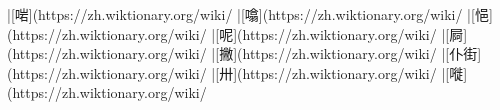 |[啱](https://zh.wiktionary.org/wiki/%
|[噏](https://zh.wiktionary.org/wiki/%
|[悒](https://zh.wiktionary.org/wiki/%
|[呢](https://zh.wiktionary.org/wiki/%
|[屙](https://zh.wiktionary.org/wiki/%
|[撇](https://zh.wiktionary.org/wiki/%
|[仆街](https://zh.wiktionary.org/wiki/%
|[卅](https://zh.wiktionary.org/wiki/%
|[嘥](https://zh.wiktionary.org/wiki/%
